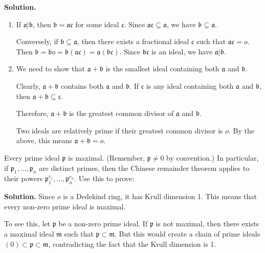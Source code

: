 \noindent\textbf{Solution.}
\begin{enumerate}[label=(\alph*)]
    \item If $\mathfrak{a} | \mathfrak{b}$, then $\mathfrak{b} = \mathfrak{a}\mathfrak{c}$ for some ideal $\mathfrak{c}$. Since $\mathfrak{a}\mathfrak{c} \subseteq \mathfrak{a}$, we have $\mathfrak{b} \subseteq \mathfrak{a}$.
    
    Conversely, if $\mathfrak{b} \subseteq \mathfrak{a}$, then there exists a fractional ideal $\mathfrak{c}$ such that $\mathfrak{a}\mathfrak{c} = o$. Then $\mathfrak{b} = \mathfrak{b}o = \mathfrak{b}(\mathfrak{a}\mathfrak{c}) = \mathfrak{a}(\mathfrak{b}\mathfrak{c})$. Since $\mathfrak{b}\mathfrak{c}$ is an ideal, we have $\mathfrak{a} | \mathfrak{b}$.
    
    \item We need to show that $\mathfrak{a} + \mathfrak{b}$ is the smallest ideal containing both $\mathfrak{a}$ and $\mathfrak{b}$.
    
    Clearly, $\mathfrak{a} + \mathfrak{b}$ contains both $\mathfrak{a}$ and $\mathfrak{b}$. If $\mathfrak{c}$ is any ideal containing both $\mathfrak{a}$ and $\mathfrak{b}$, then $\mathfrak{a} + \mathfrak{b} \subseteq \mathfrak{c}$.
    
    Therefore, $\mathfrak{a} + \mathfrak{b}$ is the greatest common divisor of $\mathfrak{a}$ and $\mathfrak{b}$.
    
    Two ideals are relatively prime if their greatest common divisor is $o$. By the above, this means $\mathfrak{a} + \mathfrak{b} = o$.
\end{enumerate}

\begin{problembox}
Every prime ideal $\mathfrak{p}$ is maximal. (Remember, $\mathfrak{p} \neq 0$ by convention.) In particular, if $\mathfrak{p}_1, \ldots, \mathfrak{p}_n$ are distinct primes, then the Chinese remainder theorem applies to their powers $\mathfrak{p}_1^{r_1}, \ldots, \mathfrak{p}_n^{r_n}$. Use this to prove:
\end{problembox}

\noindent\textbf{Solution.}
Since $o$ is a Dedekind ring, it has Krull dimension 1. This means that every non-zero prime ideal is maximal.

To see this, let $\mathfrak{p}$ be a non-zero prime ideal. If $\mathfrak{p}$ is not maximal, then there exists a maximal ideal $\mathfrak{m}$ such that $\mathfrak{p} \subset \mathfrak{m}$. But this would create a chain of prime ideals $(0) \subset \mathfrak{p} \subset \mathfrak{m}$, contradicting the fact that the Krull dimension is 1.

